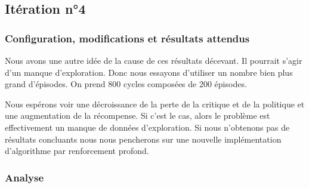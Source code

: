 \subsection{Itération n°4}

\subsubsection{Configuration, modifications et résultats attendus}

Nous avons une autre idée de la cause de ces résultats décevant. Il pourrait s'agir d'un manque d'exploration. Donc nous essayons d'utiliser un nombre bien plus grand d'épisodes. On prend 800 cycles composées de 200 épisodes.

Nous espérons voir une décroissance de la perte de la critique et de la politique et une augmentation de la récompense. Si c'est le cas, alors le problème est effectivement un manque de données d'exploration. Si nous n'obtenons pas de résultats concluants nous nous pencherons sur une nouvelle implémentation d'algorithme par renforcement profond.

\subsubsection{Analyse}

